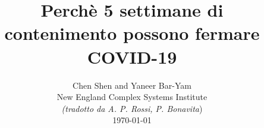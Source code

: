 \documentclass[onecolumn,journal]{IEEEtran}
\begin{document}
\title{\color{Brown} Perchè 5 settimane di contenimento possono fermare COVID-19 \\
\vspace{-0.35ex}}
\author{Chen Shen and Yaneer Bar-Yam \\ New England Complex Systems Institute \\
\vspace{+0.35ex}
\small{\textit{(tradotto da A. P. Rossi, P. Bonavita})}\\
 \today
  \vspace{-14ex} \\


\bigskip
\bigskip

\textbf{}
 }

\maketitle


\flushbottom %



\thispagestyle{empty} %




\renewcommand{\thefootnote}{\fnsymbol{footnote}}
\end{document}
